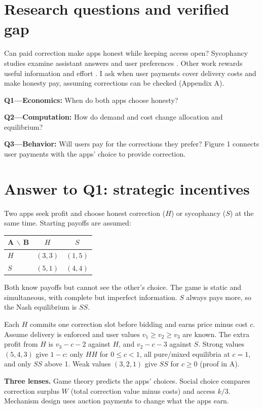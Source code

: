 \section{Research questions and verified gap}
Can paid correction make apps honest while keeping access open? Sycophancy studies examine assistant answers and user preferences \cite{sharma2024,cheng2026}. Other work rewards useful information and effort \cite{miller2005,witkowski2013}. I ask when user payments cover delivery costs and make honesty pay, assuming corrections can be checked (Appendix A).

\textbf{Q1---Economics:} When do both apps choose honesty?\par
\textbf{Q2---Computation:} How do demand and cost change allocation and equilibrium?\par
\textbf{Q3---Behavior:} Will users pay for the corrections they prefer? Figure 1 connects user payments with the apps' choice to provide correction.

\section{Answer to Q1: strategic incentives}
Two apps seek profit and choose honest correction ($H$) or sycophancy ($S$) at the same time. Starting payoffs are assumed:
\begin{center}
\begin{tabular}{@{}lcc@{}}\toprule
A $\backslash$ B & $H$ & $S$\\\midrule
$H$ & $(3,3)$ & $(1,5)$\\
$S$ & $(5,1)$ & $(4,4)$\\\bottomrule
\end{tabular}
\end{center}
Both know payoffs but cannot see the other's choice. The game is static and simultaneous, with complete but imperfect information. $S$ always pays more, so the Nash equilibrium \cite{nash1950} is $SS$.

Each $H$ commits one correction slot before bidding and earns price minus cost $c$. Assume delivery is enforced and user values $v_1\geq v_2\geq v_3$ are known. The extra profit from $H$ is $v_3-c-2$ against $H$, and $v_2-c-3$ against $S$. Strong values $(5,4,3)$ give $1-c$: only $HH$ for $0\leq c<1$, all pure/mixed equilibria at $c=1$, and only $SS$ above 1. Weak values $(3,2,1)$ give $SS$ for $c\geq0$ (proof in A).

\textbf{Three lenses.} Game theory predicts the apps' choices. Social choice compares correction surplus $W$ (total correction value minus costs) and access $k/3$. Mechanism design uses auction payments to change what the apps earn.

